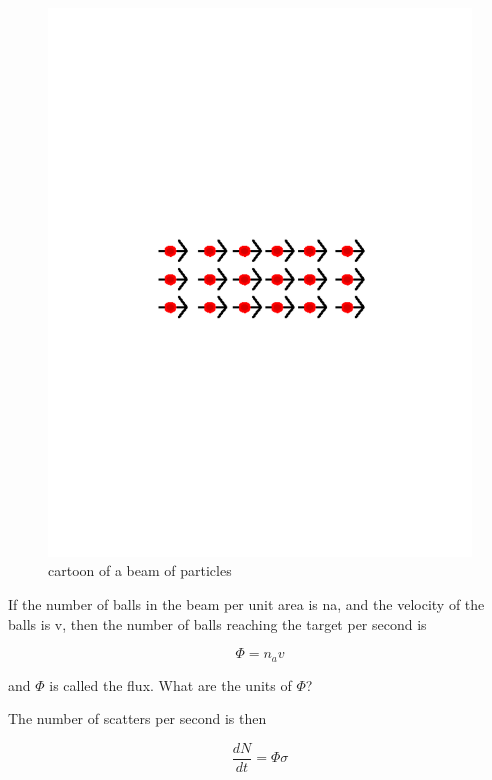 \begin{figure}[h]
\centering\includegraphics[scale=0.5]{./protonprotoncollisions/Pictures/beam.pdf}
\caption{cartoon of a beam of particles}
\label{fig:beam}
\end{figure}



If the number of balls in the beam per unit area is na, and the velocity of the balls is v,  then the number of balls reaching the target per second is

\begin{equation}\Phi = n_{a}v\end{equation}

and \(\Phi\) is called the flux.  What are the units of \(\Phi\)?

The number of scatters per second is then

\begin{equation}\frac{dN}{dt}=\Phi \sigma
\end{equation}

